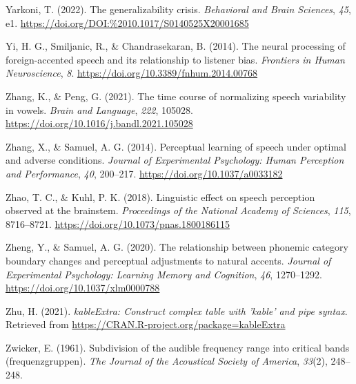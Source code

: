\documentclass[
  11pt,
  english,
  man,floatsintext]{apa6}
\newlength{\cslhangindent}
\newlength{\cslentryspacingunit} %
\newenvironment{CSLReferences}[2] %
 {%
  \setlength{\parindent}{0pt}
  \ifodd #1
  \let\oldpar\par
  \def\par{\hangindent=\cslhangindent\oldpar}
  \fi
  \setlength{\parskip}{#2\cslentryspacingunit}
 }%
 {}
\begin{document}
\begin{CSLReferences}{1}{0}
\leavevmode{}%
Yarkoni, T. (2022). The generalizability crisis. \emph{Behavioral and Brain Sciences}, \emph{45}, e1. \url{https://doi.org/DOI:\%2010.1017/S0140525X20001685}

\leavevmode{}%
Yi, H. G., Smiljanic, R., \& Chandrasekaran, B. (2014). The neural processing of foreign-accented speech and its relationship to listener bias. \emph{Frontiers in Human Neuroscience}, \emph{8}. \url{https://doi.org/10.3389/fnhum.2014.00768}

\leavevmode{}%
Zhang, K., \& Peng, G. (2021). The time course of normalizing speech variability in vowels. \emph{Brain and Language}, \emph{222}, 105028. \url{https://doi.org/10.1016/j.bandl.2021.105028}

\leavevmode{}%
Zhang, X., \& Samuel, A. G. (2014). Perceptual learning of speech under optimal and adverse conditions. \emph{Journal of Experimental Psychology: Human Perception and Performance}, \emph{40}, 200--217. \url{https://doi.org/10.1037/a0033182}

\leavevmode{}%
Zhao, T. C., \& Kuhl, P. K. (2018). Linguistic effect on speech perception observed at the brainstem. \emph{Proceedings of the National Academy of Sciences}, \emph{115}, 8716--8721. \url{https://doi.org/10.1073/pnas.1800186115}

\leavevmode{}%
Zheng, Y., \& Samuel, A. G. (2020). The relationship between phonemic category boundary changes and perceptual adjustments to natural accents. \emph{Journal of Experimental Psychology: Learning Memory and Cognition}, \emph{46}, 1270--1292. \url{https://doi.org/10.1037/xlm0000788}

\leavevmode{}%
Zhu, H. (2021). \emph{kableExtra: Construct complex table with 'kable' and pipe syntax}. Retrieved from \url{https://CRAN.R-project.org/package=kableExtra}

\leavevmode{}%
Zwicker, E. (1961). Subdivision of the audible frequency range into critical bands (frequenzgruppen). \emph{The Journal of the Acoustical Society of America}, \emph{33}(2), 248--248.

\end{CSLReferences}

\endgroup
\end{document}
